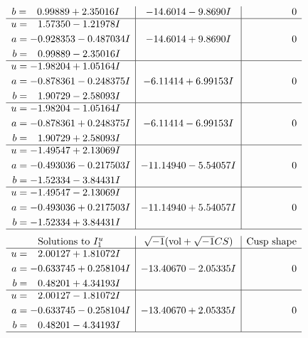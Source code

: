 \documentclass[1p]{elsarticle_modified}
\theoremstyle{definition}
\newcommand{\I}{\sqrt{-1}}
\begin{document}
$$\begin{array}{c|c|c}
\begin{aligned}
b &= \phantom{-}0.99889 + 2.35016 I\end{aligned}
 & -14.6014 - 9.8690 I & \phantom{-0.000000 } 0 \\ \hline\begin{aligned}
u &= \phantom{-}1.57350 - 1.21978 I \\
a &= -0.928353 - 0.487034 I \\
b &= \phantom{-}0.99889 - 2.35016 I\end{aligned}
 & -14.6014 + 9.8690 I & \phantom{-0.000000 } 0 \\ \hline\begin{aligned}
u &= -1.98204 + 1.05164 I \\
a &= -0.878361 - 0.248375 I \\
b &= \phantom{-}1.90729 - 2.58093 I\end{aligned}
 & -6.11414 + 6.99153 I & \phantom{-0.000000 } 0 \\ \hline\begin{aligned}
u &= -1.98204 - 1.05164 I \\
a &= -0.878361 + 0.248375 I \\
b &= \phantom{-}1.90729 + 2.58093 I\end{aligned}
 & -6.11414 - 6.99153 I & \phantom{-0.000000 } 0 \\ \hline\begin{aligned}
u &= -1.49547 + 2.13069 I \\
a &= -0.493036 - 0.217503 I \\
b &= -1.52334 - 3.84431 I\end{aligned}
 & -11.14940 - 5.54057 I & \phantom{-0.000000 } 0 \\ \hline\begin{aligned}
u &= -1.49547 - 2.13069 I \\
a &= -0.493036 + 0.217503 I \\
b &= -1.52334 + 3.84431 I\end{aligned}
 & -11.14940 + 5.54057 I & \phantom{-0.000000 } 0\\
 \hline 
 \end{array}$$\newpage$$\begin{array}{c|c|c}  
\text{Solutions to }I^u_{1}& \I (\text{vol} + \sqrt{-1}CS) & \text{Cusp shape}\\
 \hline 
\begin{aligned}
u &= \phantom{-}2.00127 + 1.81072 I \\
a &= -0.633745 + 0.258104 I \\
b &= \phantom{-}0.48201 + 4.34193 I\end{aligned}
 & -13.40670 - 2.05335 I & \phantom{-0.000000 } 0 \\ \hline\begin{aligned}
u &= \phantom{-}2.00127 - 1.81072 I \\
a &= -0.633745 - 0.258104 I \\
b &= \phantom{-}0.48201 - 4.34193 I\end{aligned}
 & -13.40670 + 2.05335 I & \phantom{-0.000000 } 0\\
 \hline 
 \end{array}$$\newpage\newpage\renewcommand{\arraystretch}{1}
\end{document}
